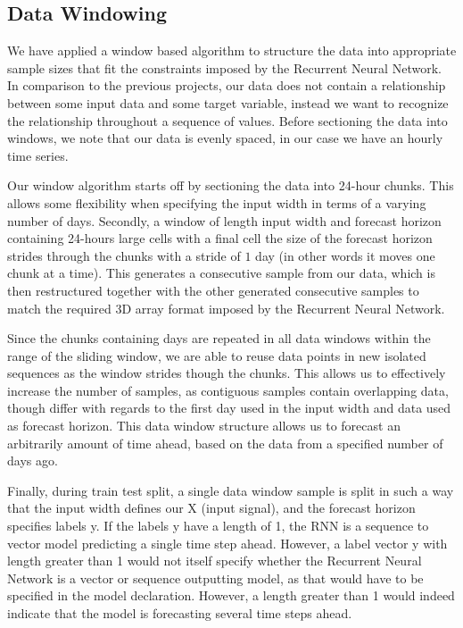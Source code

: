 \documentclass
[twocolumn,
secnumarabic,
nobibnotes,
aps,
prl,
reprint,
groupedaddress,
amsmath,
amssymb,
]{revtex4-2}
\begin{document}
\subsection{Data Windowing}
We have applied a window based algorithm to structure the data into appropriate sample sizes that fit the constraints imposed by the Recurrent Neural Network. In comparison to the previous projects, our data does not contain a relationship between some input data and some target variable, instead we want to recognize the relationship throughout a sequence of values. Before sectioning the data into windows, we note that our data is evenly spaced, in our case we have an hourly time series. 

Our window algorithm starts off by sectioning the data into 24-hour chunks. This allows some flexibility when specifying the input width in terms of a varying number of days. Secondly, a window of length input width and forecast horizon containing 24-hours large cells with a final cell the size of the forecast horizon strides through the chunks with a stride of $1$ day (in other words it moves one chunk at a time). This generates a consecutive sample from our data, which is then restructured together with the other generated consecutive samples to match the required 3D array format imposed by the Recurrent Neural Network.

Since the chunks containing days are repeated in all data windows within the range of the sliding window, we are able to reuse data points in new isolated sequences as the window strides though the chunks. This allows us to effectively increase the number of samples, as contiguous samples contain overlapping data, though differ with regards to the first day used in the input width and data used as forecast horizon. This data window structure allows us to forecast an arbitrarily amount of time ahead, based on the data from a specified number of days ago.

Finally, during train test split, a single data window sample is split in such a way that the input width defines our X (input signal), and the forecast horizon specifies labels y. If the labels y have a length of 1, the RNN is a sequence to vector model predicting a single time step ahead. However, a label vector y with length greater than 1 would not itself specify whether the Recurrent Neural Network is a vector or sequence outputting model, as that would have to be specified in the model declaration. However, a length greater than 1 would indeed indicate that the model is forecasting several time steps ahead. 
\end{document}
